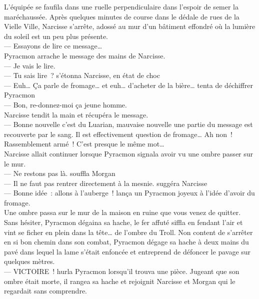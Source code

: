 \documentclass[french, a4paper, 12pt]{article}
\begin{document}
L'équipée se faufila dans une ruelle perpendiculaire dans l'espoir de semer la maréchaussée. Après quelques minutes de course dans le dédale de rues de la Vielle Ville, Narcisse s'arrête, adossé au mur d'un bâtiment effondré où la lumière du soleil est un peu plus présente.\\
--- Essayons de lire ce message…\\
Pyracmon arrache le message des mains de Narcisse.\\
--- Je vais le lire.\\
--- Tu sais lire~? s'étonna Narcisse, en état de choc\\
--- Euh… Ça parle de fromage… et euh… d'acheter de la bière… tenta de déchiffrer Pyracmon\\
--- Bon, re-donnez-moi ça jeune homme.\\
Narcisse tendit la main et récupéra le message.\\
--- Bonne nouvelle c'est du Luarian, mauvaise nouvelle une partie du message est recouverte par le sang. Il est effectivement question de fromage… Ah non~! Rassemblement armé~! C'est presque le même mot…\\
Narcisse allait continuer lorsque Pyracmon signala avoir vu une ombre passer sur le mur.\\
--- Ne restons pas là. souffla Morgan\\
--- Il ne faut pas rentrer directement à la mesnie. suggéra Narcisse\\
--- Bonne idée~: allons à l'auberge~! lança un Pyracmon joyeux à l'idée d'avoir du fromage.\\
Une ombre passa sur le mur de la maison en ruine que vous venez de quitter. Sans hésiter, Pyracmon dégaina sa hache, le fer affuté siffla en fendant l'air et vint se ficher en plein dans la tête… de l'ombre du Troll. Non content de s'arrêter en si bon chemin dans son combat, Pyracmon dégage sa hache à deux mains du pavé dans lequel la lame s'était enfoncée et entreprend de défoncer le pavage sur quelques mètres.\\
--- VICTOIRE~! hurla Pyracmon lorsqu'il trouva une pièce. Jugeant que son ombre était morte, il rangea sa hache et rejoignit Narcisse et Morgan qui le regardait sans comprendre.\\
\end{document}
